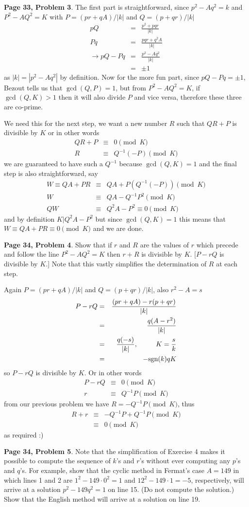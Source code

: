 \documentclass[aps,preprint,preprintnumbers,nofootinbib,showpacs,prd]{revtex4-1}
\newcommand{\nbea}{\begin{eqnarray*}}
\newcommand{\neea}{\end{eqnarray*}}
\begin{document}
{\bf Page 33, Problem 3}. The first part is straightforward, since $p^2 - Aq^2 = k$ and $P^2 - AQ^2 = K$ with $P = (pr + qA)/|k|$ and $Q = (p + qr)/|k|$
%
\nbea
pQ & = & \frac{p^2 + pqr}{|k|} \\
Pq & = & \frac{pqr + q^2A}{|k|} \\
\to pQ - Pq & = & \frac{p^2 - Aq^2}{|k|} \\
& = & \pm 1
\neea
%
as $|k| = |p^2-Aq^2|$ by definition. Now for the more fun part, since $pQ - Pq = \pm1$, Bezout tells us that $\gcd(Q, P) = 1$, but from $P^2 - AQ^2 = K$, if $\gcd(Q,K) > 1$ then it will also divide $P$ and vice versa, therefore these three are co-prime.

We need this for the next step, we want a new number $R$ such that $QR + P$ is divisible by $K$ or in other words
%
\nbea
QR + P & \equiv & 0 \pmod{K} \\
R & \equiv & Q^{-1}(-P) \pmod{K}
\neea
%
we are guaranteed to have such a $Q^{-1}$ because $\gcd(Q,K) = 1$ and the final step is also straightforward, say
%
\nbea
W \equiv QA + PR & \equiv & QA + P(Q^{-1}(-P)) \pmod{K} \\
W & \equiv & QA - Q^{-1} P^2 \pmod{K} \\
QW & \equiv & Q^2A - P^2 \equiv 0 \pmod{K}
\neea
%
and by definition $K|Q^2A - P^2$ but since $\gcd(Q,K) = 1$ this means that $W \equiv QA + PR \equiv 0 \pmod{K}$ and we are done.

{\bf Page 34, Problem 4}. Show that if $r$ and $R$ are the values of $r$ which precede and follow the line $P^2 - AQ^2 = K$ then $r + R$ is divisible by $K$. [$P-rQ$ is divisible by $K$.] Note that this vastly simplifies the determination of $R$ at each step.

Again $P = (pr + qA)/|k|$ and $Q = (p + qr)/|k|$, also $r^2 - A = s$
%
\nbea
P - rQ & = & \frac{(pr + qA) - r(p + qr)}{|k|} \\
& = & \frac{q(A-r^2)}{|k|} \\
& = & \frac{q(-s)}{|k|}, ~~~~~~~~ K = \frac{s}{k} \\
& = & -{\rm sgn}(k) qK
\neea
%
so $P- rQ$ is divisible by $K$. Or in other words
%
\nbea
P - rQ & \equiv & 0 \pmod{K} \\
r & \equiv & Q^{-1}P \pmod{K}
\neea
%
from our previous problem we have $R = -Q^{-1}P \pmod{K}$, thus
%
\nbea
R + r & \equiv & -Q^{-1}P + Q^{-1}P \pmod{K} \\
& \equiv & 0 \pmod{K}
\neea
%
as required :)

{\bf Page 34, Problem 5}. Note that the simplification of Exercise 4 makes it possible to compute the sequence of $k$'s and $r$'s without ever computing any $p$'s and $q$'s. For example, show that the cyclic method in Fermat's case $A = 149$ in which lines 1 and 2 are $1^2 - 149\cdot0^2 = 1$ and $12^2 - 149\cdot 1 = -5$, respectively, will arrive at a solution $p^2 - 149q^2 = 1$ on line 15. (Do not compute the solution.) Show that the English method will arrive at a solution on line 19.
\end{document}
